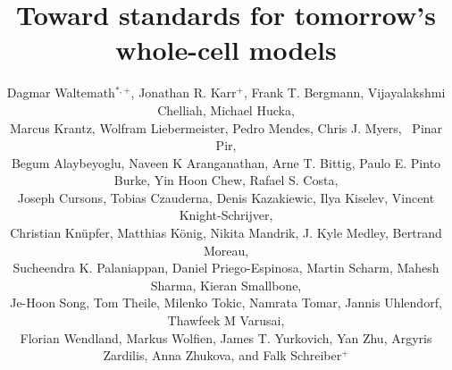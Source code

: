 \documentclass[journal,transmag]{IEEEtran}
\begin{document}
\nocite{IEEEBSTcontrol}

\title{Toward standards for tomorrow's whole-cell models}

\author{
    Dagmar Waltemath$^{*,+}$,
    Jonathan R. Karr$^+$, 
    Frank T. Bergmann,
    Vijayalakshmi Chelliah,
    Michael Hucka,\\
   Marcus Krantz,
    Wolfram Liebermeister,
   Pedro Mendes,
    Chris J. Myers,~
    Pinar Pir,\\
    Begum Alaybeyoglu,
    Naveen K Aranganathan,
    Arne T. Bittig,
    Paulo E. Pinto Burke, 
    Yin Hoon Chew,
    Rafael S. Costa,\\
    Joseph Cursons, 
    Tobias Czauderna,
    Denis Kazakiewic, 
    Ilya Kiselev,
    Vincent Knight-Schrijver,\\
    Christian Kn\"{u}pfer,
    Matthias K\"{o}nig,
    Nikita Mandrik,
    J. Kyle Medley,
    Bertrand Moreau, \\
    Sucheendra K. Palaniappan,
   Daniel Priego-Espinosa, 
    Martin Scharm,
    Mahesh Sharma,
    Kieran Smallbone,\\
    Je-Hoon Song,
    Tom Theile,
    Milenko Tokic, 
    Namrata Tomar, 
    Jannis Uhlendorf, 
    Thawfeek M Varusai,\\
    Florian Wendland, 
    Markus Wolfien,
    James T. Yurkovich,
    Yan Zhu, 
    Argyris Zardilis, 
    Anna Zhukova, and
    Falk Schreiber$^+$\\
	
}
\end{document}
